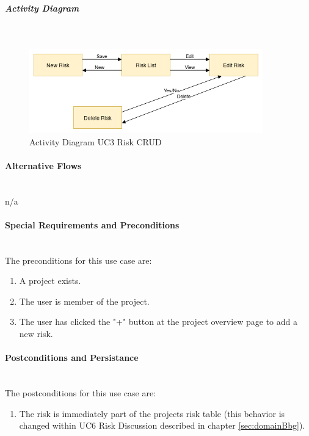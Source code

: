  
\subparagraph{Activity Diagram}\mbox{}\\
\begin{figure}[h]
	\centering
	\includegraphics[width=0.9\textwidth]{Content/Domain/UC3RiskCRUDactivitydiagram.png}
	\caption{Activity Diagram \ac{UC}3 Risk CRUD}
	\label{fig:activityDiagramUC3}
\end{figure}

\paragraph*{Alternative Flows}\mbox{}\\
n/a

\paragraph*{Special Requirements and Preconditions}\mbox{}\\
The preconditions for this use case are:
\begin{enumerate}
	\vspace{-3mm}
	\setlength\itemsep{-1em}
	\item A project exists.
	\item The user is member of the project.
	\item The user has clicked the "+" button at the project overview page to add a new risk.
\end{enumerate}

\paragraph*{Postconditions and Persistance}\mbox{}\\
The postconditions for this use case are:
\begin{enumerate}
	\vspace{-3mm}
	\setlength\itemsep{-1em}
	\item The risk is immediately part of the projects risk table (this behavior is changed within UC6 Risk Discussion described in chapter \ref{sec:domainBbg}).
\end{enumerate}

